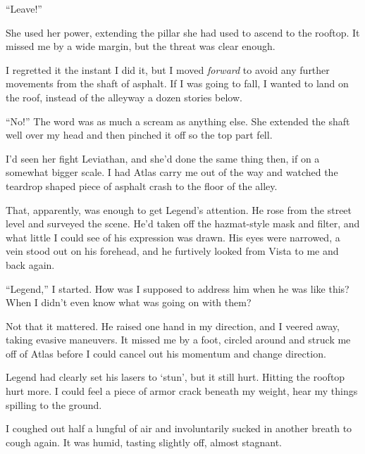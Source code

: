 ``Leave!''



She used her power, extending the pillar she had used to ascend to the rooftop.  It missed me by a wide margin, but the threat was clear enough.



I regretted it the instant I did it, but I moved \emph{forward} to avoid any further movements from the shaft of asphalt.  If I was going to fall, I wanted to land on the roof, instead of the alleyway a dozen stories below.



``No!''  The word was as much a scream as anything else.  She extended the shaft well over my head and then pinched it off so the top part fell.



I'd seen her fight Leviathan, and she'd done the same thing then, if on a somewhat bigger scale.  I had Atlas carry me out of the way and watched the teardrop shaped piece of asphalt crash to the floor of the alley.



That, apparently, was enough to get Legend's attention.  He rose from the street level and surveyed the scene.  He'd taken off the hazmat-style mask and filter, and what little I could see of his expression was drawn.  His eyes were narrowed, a vein stood out on his forehead, and he furtively looked from Vista to me and back again.



``Legend,'' I started.  How was I supposed to address him when he was like this?  When I didn't even know what was going on with them?



Not that it mattered.  He raised one hand in my direction, and I veered away, taking evasive maneuvers.  It missed me by a foot, circled around and struck me off of Atlas before I could cancel out his momentum and change direction.



Legend had clearly set his lasers to `stun', but it still hurt.  Hitting the rooftop hurt more.  I could feel a piece of armor crack beneath my weight, hear my things spilling to the ground.



I coughed out half a lungful of air and involuntarily sucked in another breath to cough again.  It was humid, tasting slightly off, almost stagnant.



